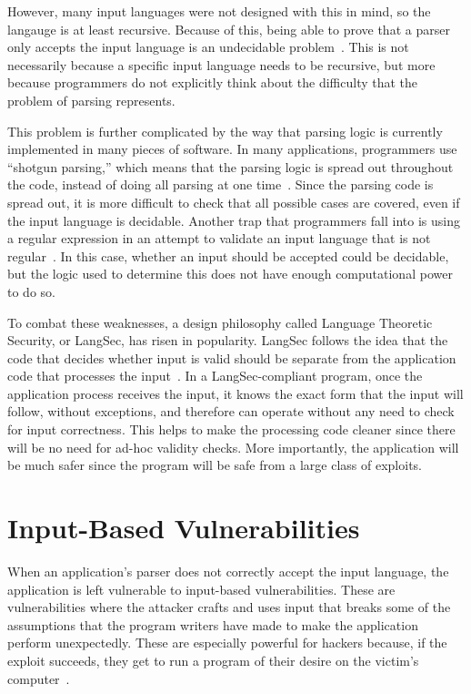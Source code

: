 However, many input languages were not designed with this in mind, so the langauge is at least recursive.  Because of this, being able to prove that a parser only accepts the input language is an undecidable problem~\cite{sassaman2011halting}.  This is not necessarily because a specific input language needs to be recursive, but more because programmers do not explicitly think about the difficulty that the problem of parsing represents.

This problem is further complicated by the way that parsing logic is currently implemented in many pieces of software.  In many applications, programmers use ``shotgun parsing,'' which means that the parsing logic is spread out throughout the code, instead of doing all parsing at one time~\cite{bratus2017parsing}.  Since the parsing code is spread out, it is more difficult to check that all possible cases are covered, even if the input language is decidable.  Another trap that programmers fall into is using a regular expression in an attempt to validate an input language that is not regular~\cite{bratus2017parsing}.  In this case, whether an input should be accepted could be decidable, but the logic used to determine this does not have enough computational power to do so.

To combat these weaknesses, a design philosophy called Language Theoretic Security, or LangSec, has risen in popularity.  LangSec follows the idea that the code that decides whether input is valid should be separate from the application code that processes the input~\cite{langsec_language-theoretic_security}.  In a LangSec-compliant program, once the application process receives the input, it knows the exact form that the input will follow, without exceptions, and therefore can operate without any need to check for input correctness.  This helps to make the processing code cleaner since there will be no need for ad-hoc validity checks.  More importantly, the application will be much safer since the program will be safe from a large class of exploits.

\section{Input-Based Vulnerabilities}
\label{sec:inputBasedVulnerabilities}
When an application's parser does not correctly accept the input language, the application is left vulnerable to input-based vulnerabilities.  These are vulnerabilities where the attacker crafts and uses input that breaks some of the assumptions that the program writers have made to make the application perform unexpectedly.  These are especially powerful for hackers because, if the exploit succeeds, they get to run a program of their desire on the victim's computer~\cite{sassaman2011halting}.

